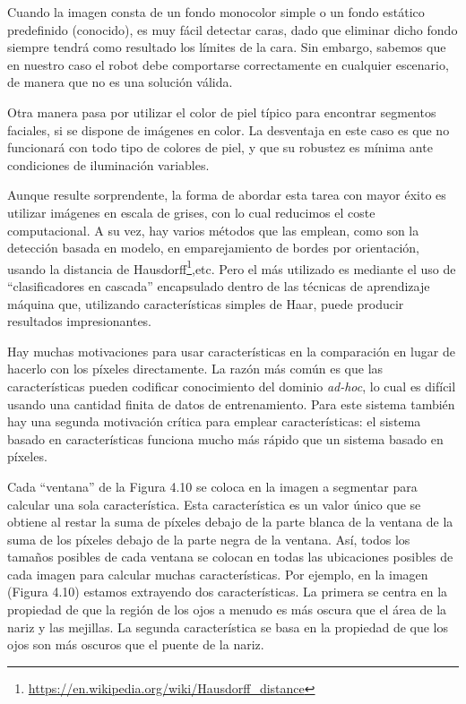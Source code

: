 Cuando la imagen consta de un fondo monocolor simple o un fondo estático predefinido (conocido), es muy fácil detectar caras, dado que eliminar dicho fondo siempre tendrá como resultado los límites de la cara. Sin embargo, sabemos que en nuestro caso el robot debe comportarse correctamente en cualquier escenario, de manera que no es una solución válida.

Otra manera pasa por utilizar el color de piel típico para encontrar segmentos faciales, si se dispone de imágenes en color. La desventaja en este caso es que no funcionará con todo tipo de colores de piel, y que su robustez es mínima ante condiciones de iluminación variables. 

Aunque resulte sorprendente, la forma de abordar esta tarea con mayor éxito es utilizar imágenes en escala de grises, con lo cual reducimos el coste computacional. A su vez, hay varios métodos que las emplean, como son la detección basada en modelo, en emparejamiento de bordes por orientación, usando la distancia de Hausdorff\footnote{\url{https://en.wikipedia.org/wiki/Hausdorff_distance}},etc. Pero el más utilizado es mediante el uso de ``clasificadores en cascada'' encapsulado dentro de las técnicas de aprendizaje máquina que, utilizando características simples de Haar, puede producir resultados impresionantes.

Hay muchas motivaciones para usar características en la comparación en lugar de hacerlo con los píxeles directamente. La razón más común es que las características pueden codificar conocimiento del dominio \textit{ad-hoc}, lo cual es difícil usando una cantidad finita de datos de entrenamiento. Para este sistema también hay una segunda motivación crítica para emplear características: el sistema basado en características funciona mucho más rápido que un sistema basado en píxeles. 

Cada “ventana” de la Figura 4.10 se coloca en la imagen a segmentar para calcular una sola característica. Esta característica es un valor único que se obtiene al restar la suma de píxeles debajo de la parte blanca de la ventana de la suma de los píxeles debajo de la parte negra de la ventana. Así, todos los tamaños posibles de cada ventana se colocan en todas las ubicaciones posibles de cada imagen para calcular muchas características. Por ejemplo, en la imagen (Figura 4.10) estamos extrayendo dos características. La primera se centra en la propiedad de que la región de los ojos a menudo es más oscura que el área de la nariz y las mejillas. La segunda característica se basa en la propiedad de que los ojos son más oscuros que el puente de la nariz.


